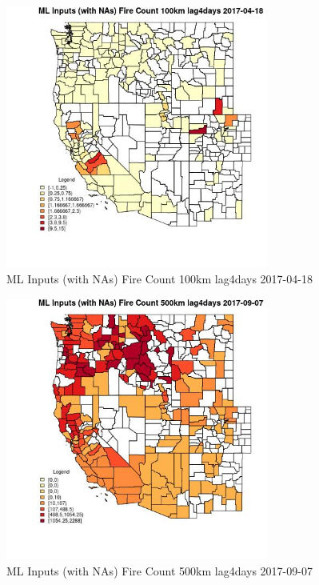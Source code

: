 \begin{figure} 
\centering  
\includegraphics[width=0.77\textwidth]{Code_Outputs/Report_ML_input_PM25_Step4_part_e_de_duplicated_aves_compiled_2019-05-21wNAs_CountyFire_Count_100km_lag4daysMean2017-04-18.jpg} 
\caption{\label{fig:Report_ML_input_PM25_Step4_part_e_de_duplicated_aves_compiled_2019-05-21wNAsCountyFire_Count_100km_lag4daysMean2017-04-18}ML Inputs (with NAs) Fire Count 100km lag4days 2017-04-18} 
\end{figure} 
 

\begin{figure} 
\centering  
\includegraphics[width=0.77\textwidth]{Code_Outputs/Report_ML_input_PM25_Step4_part_e_de_duplicated_aves_compiled_2019-05-21wNAs_CountyFire_Count_500km_lag4daysMean2017-09-07.jpg} 
\caption{\label{fig:Report_ML_input_PM25_Step4_part_e_de_duplicated_aves_compiled_2019-05-21wNAsCountyFire_Count_500km_lag4daysMean2017-09-07}ML Inputs (with NAs) Fire Count 500km lag4days 2017-09-07} 
\end{figure} 
 

